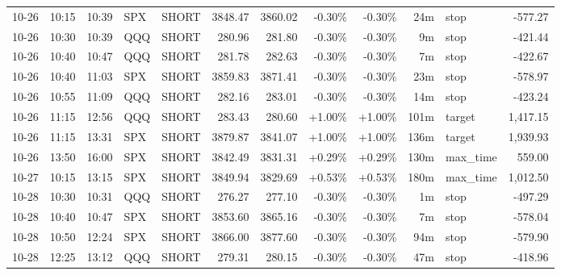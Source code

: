 \documentclass[11pt,a4paper]{article}
\begin{document}
\begin{center}
\begin{longtable}{>{\color{txtmain}}l l l l l r r r r r >{\color{txtmain}}l r}
10-26 & 10:15 & 10:39 & SPX & SHORT & 3848.47 & 3860.02 & \textcolor{lossred}{-0.30\%} & \textcolor{lossred}{-0.30\%} & 24m & stop & \textcolor{lossred}{-577.27} \\
10-26 & 10:30 & 10:39 & QQQ & SHORT & 280.96 & 281.80 & \textcolor{lossred}{-0.30\%} & \textcolor{lossred}{-0.30\%} & 9m & stop & \textcolor{lossred}{-421.44} \\
10-26 & 10:40 & 10:47 & QQQ & SHORT & 281.78 & 282.63 & \textcolor{lossred}{-0.30\%} & \textcolor{lossred}{-0.30\%} & 7m & stop & \textcolor{lossred}{-422.67} \\
10-26 & 10:40 & 11:03 & SPX & SHORT & 3859.83 & 3871.41 & \textcolor{lossred}{-0.30\%} & \textcolor{lossred}{-0.30\%} & 23m & stop & \textcolor{lossred}{-578.97} \\
10-26 & 10:55 & 11:09 & QQQ & SHORT & 282.16 & 283.01 & \textcolor{lossred}{-0.30\%} & \textcolor{lossred}{-0.30\%} & 14m & stop & \textcolor{lossred}{-423.24} \\
10-26 & 11:15 & 12:56 & QQQ & SHORT & 283.43 & 280.60 & \textcolor{wingreen}{+1.00\%} & \textcolor{wingreen}{+1.00\%} & 101m & target & \textcolor{wingreen}{1,417.15} \\
10-26 & 11:15 & 13:31 & SPX & SHORT & 3879.87 & 3841.07 & \textcolor{wingreen}{+1.00\%} & \textcolor{wingreen}{+1.00\%} & 136m & target & \textcolor{wingreen}{1,939.93} \\
10-26 & 13:50 & 16:00 & SPX & SHORT & 3842.49 & 3831.31 & \textcolor{wingreen}{+0.29\%} & \textcolor{wingreen}{+0.29\%} & 130m & max\_time & \textcolor{wingreen}{559.00} \\
10-27 & 10:15 & 13:15 & SPX & SHORT & 3849.94 & 3829.69 & \textcolor{wingreen}{+0.53\%} & \textcolor{wingreen}{+0.53\%} & 180m & max\_time & \textcolor{wingreen}{1,012.50} \\
10-28 & 10:30 & 10:31 & QQQ & SHORT & 276.27 & 277.10 & \textcolor{lossred}{-0.30\%} & \textcolor{lossred}{-0.30\%} & 1m & stop & \textcolor{lossred}{-497.29} \\
10-28 & 10:40 & 10:47 & SPX & SHORT & 3853.60 & 3865.16 & \textcolor{lossred}{-0.30\%} & \textcolor{lossred}{-0.30\%} & 7m & stop & \textcolor{lossred}{-578.04} \\
10-28 & 10:50 & 12:24 & SPX & SHORT & 3866.00 & 3877.60 & \textcolor{lossred}{-0.30\%} & \textcolor{lossred}{-0.30\%} & 94m & stop & \textcolor{lossred}{-579.90} \\
10-28 & 12:25 & 13:12 & QQQ & SHORT & 279.31 & 280.15 & \textcolor{lossred}{-0.30\%} & \textcolor{lossred}{-0.30\%} & 47m & stop & \textcolor{lossred}{-418.96} \\

\end{longtable}
\end{center}
\end{document}
